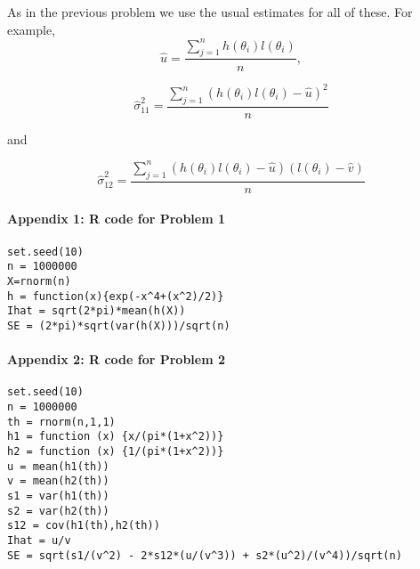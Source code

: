 \documentclass[12pt, leqno]{article}
\begin{document}
As in the previous problem we use the usual estimates for all of
these. For example,
\[
\hat{u} = \frac{\sum_{j=1}^n h(\theta_i) l(\theta_i)}{n} ,
\]

\[
\hat{\sigma }_{11}^2 = \frac{\sum_{j=1}^n (h(\theta_i) l(\theta_i) - \hat{u})^2}
{n}\]

and

\[
\hat{\sigma }_{12}^2 = \frac{\sum_{j=1}^n (h(\theta_i) l(\theta_i) - \hat{u})(l(\theta_i) - \hat{v})}
{n}\]

\pagebreak

\paragraph{Appendix 1: R code for Problem 1}
\begin{verbatim}
set.seed(10)
n = 1000000
X=rnorm(n)
h = function(x){exp(-x^4+(x^2)/2)}
Ihat = sqrt(2*pi)*mean(h(X))
SE = (2*pi)*sqrt(var(h(X)))/sqrt(n)
\end{verbatim}

\paragraph{Appendix 2: R code for Problem 2}
\begin{verbatim}
set.seed(10)
n = 1000000
th = rnorm(n,1,1)
h1 = function (x) {x/(pi*(1+x^2))}
h2 = function (x) {1/(pi*(1+x^2))}
u = mean(h1(th))
v = mean(h2(th))
s1 = var(h1(th))
s2 = var(h2(th))
s12 = cov(h1(th),h2(th))
Ihat = u/v
SE = sqrt(s1/(v^2) - 2*s12*(u/(v^3)) + s2*(u^2)/(v^4))/sqrt(n)
\end{verbatim}
\end{document}
